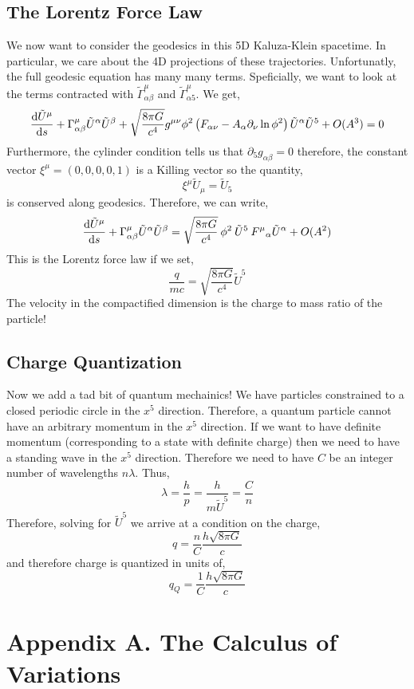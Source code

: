 \documentclass[11pt, a4paper]{article}
\begin{document}
\subsection{The Lorentz Force Law}

We now want to consider the geodesics in this 5D Kaluza-Klein spacetime. In particular, we care about the 4D projections of these trajectories. Unfortunatly, the full geodesic equation has many many terms. Speficially, we want to look at the terms contracted with $\tilde{\Gamma}^{\mu}_{\alpha \beta}$ and $\tilde{\Gamma}^{\mu}_{\alpha 5}$. We get,
\[ \frac{\mathrm{d}\tilde{U}^\mu}{\mathrm{d}s} + \Gamma^\mu_{\alpha \beta} \tilde{U}^\alpha \tilde{U}^\beta + \sqrt{\frac{8 \pi G}{c^4}} g^{\mu \nu} \phi^2 \left( F_{\alpha \nu} - A_{\alpha} \partial_{\nu} \ln{\phi^2} \right) \tilde{U}^\alpha \tilde{U}^5 + O(A^3) = 0 \]
Furthermore, the cylinder condition tells us that $\partial_5 g_{\alpha \beta} = 0$ therefore, the constant vector $\xi^\mu = (0, 0, 0, 0, 1)$ is a Killing vector so the quantity,
\[ \xi^\mu \tilde{U}_\mu = \tilde{U}_5 \]
is conserved along geodesics. Therefore, we can write,
\[ \frac{\mathrm{d}\tilde{U}^\mu}{\mathrm{d}s} + \Gamma^\mu_{\alpha \beta} \tilde{U}^\alpha \tilde{U}^\beta = \sqrt{\frac{8 \pi G}{c^4}} \: \phi^2 \: \tilde{U}^5 \: {F^\mu}_{\alpha} \tilde{U}^\alpha + O(A^2) \]
This is the Lorentz force law if we set,
\[ \frac{q}{mc} = \sqrt{\frac{8 \pi G}{c^4}} \tilde{U}^5\]
The velocity in the compactified dimension is the charge to mass ratio of the particle!

\subsection{Charge Quantization}

Now we add a tad bit of quantum mechainics! We have particles constrained to a closed periodic circle in the $x^5$ direction. Therefore, a quantum particle cannot have an arbitrary momentum in the $x^5$ direction. If we want to have definite momentum (corresponding to a state with definite charge) then we need to have a standing wave in the $x^5$ direction. Therefore we need to have $C$ be an integer number of wavelengths $n \lambda$. Thus,
\[ \lambda = \frac{h}{p} = \frac{h}{m \tilde{U}^5} = \frac{C}{n} \]  
Therefore, solving for $\tilde{U}^5$ we arrive at a condition on the charge,
\[ q = \frac{n}{C} \frac{h \sqrt{8 \pi G}}{c}  \]
and therefore charge is quantized in units of,
\[ q_Q = \frac{1}{C} \frac{h \sqrt{8 \pi G}}{c} \]

\section{Appendix A. The Calculus of Variations}
\end{document}
